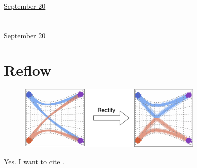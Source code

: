 \documentclass[letterpaper,11pt]{article}
\begin{document}
\section{ }



\clearpage


\href{run:2025-09-20-test-tags.tex}{\Huge September 20} %

\section*{ }



\clearpage


\href{run:2025-09-20.tex}{\Huge September 20} %

\section*{Reflow}

\begin{figure}[h]
\centering 
\includegraphics[width=0.8\textwidth]{assets/figures/2025/curved_reflow.png}
\end{figure} 


Yes. I want to cite \cite{li2022diffusion}. 



\clearpage




\end{document}
